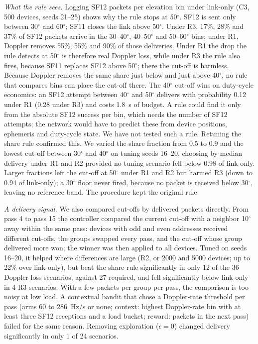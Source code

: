 \documentclass[journal]{IEEEtran}
\begin{document}
\emph{What the rule sees.} Logging SF12 packets per elevation bin under link-only (C3, 500 devices, seeds 21--25) shows why the rule stops at 50$^\circ$. SF12 is sent only between 30$^\circ$ and 60$^\circ$; SF11 closes the link above 50$^\circ$. Under R3, 17\%, 28\% and 37\% of SF12 packets arrive in the 30--40$^\circ$, 40--50$^\circ$ and 50--60$^\circ$ bins; under R1, Doppler removes 55\%, 55\% and 90\% of those deliveries. Under R1 the drop the rule detects at 50$^\circ$ is therefore real Doppler loss, while under R3 the rule also fires, because SF11 replaces SF12 above 50$^\circ$; there the cut-off is harmless. Because Doppler removes the same share just below and just above 40$^\circ$, no rule that compares bins can place the cut-off there. The 40$^\circ$ cut-off wins on duty-cycle economics: an SF12 attempt between 40$^\circ$ and 50$^\circ$ delivers with probability 0.12 under R1 (0.28 under R3) and costs 1.8~s of budget. A rule could find it only from the absolute SF12 success per bin, which needs the number of SF12 attempts; the network would have to predict these from device positions, ephemeris and duty-cycle state. We have not tested such a rule. Retuning the share rule confirmed this. We varied the share fraction from 0.5 to 0.9 and the lowest cut-off between 30$^\circ$ and 40$^\circ$ on tuning seeds 16--20, choosing by median delivery under R1 and R2 provided no tuning scenario fell below 0.98 of link-only. Larger fractions left the cut-off at 50$^\circ$ under R1 and R2 but harmed R3 (down to 0.94 of link-only); a 30$^\circ$ floor never fired, because no packet is received below 30$^\circ$, leaving no reference band. The procedure kept the original rule.

\emph{A delivery signal.} We also compared cut-offs by delivered packets directly. From pass 4 to pass 15 the controller compared the current cut-off with a neighbor 10$^\circ$ away within the same pass: devices with odd and even addresses received different cut-offs, the groups swapped every pass, and the cut-off whose group delivered more won; the winner was then applied to all devices. Tuned on seeds 16--20, it helped where differences are large (R2, or 2000 and 5000 devices; up to 22\% over link-only), but beat the share rule significantly in only 12 of the 36 Doppler-loss scenarios, against 27 required, and fell significantly below link-only in 4 R3 scenarios. With a few packets per group per pass, the comparison is too noisy at low load. A contextual bandit that chose a Doppler-rate threshold per pass (arms 60 to 286~Hz/s or none; context: highest Doppler-rate bin with at least three SF12 receptions and a load bucket; reward: packets in the next pass) failed for the same reason. Removing exploration ($\epsilon=0$) changed delivery significantly in only 1 of 24 scenarios.
\end{document}
